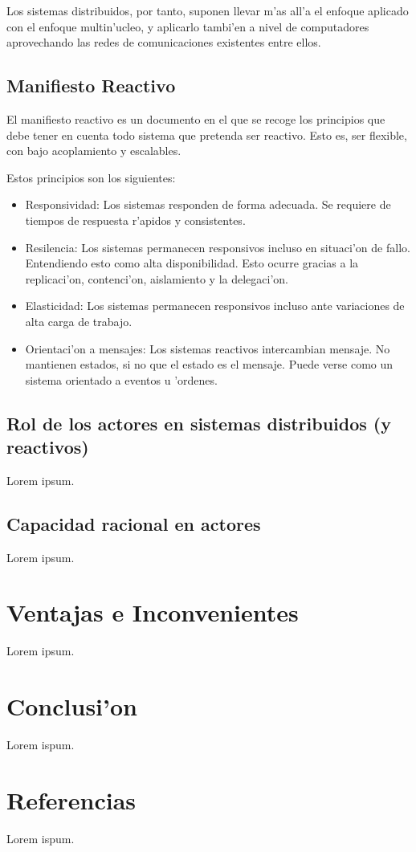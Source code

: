 \documentclass[12pt]{article}
\begin{document}
Los sistemas distribuidos, por tanto, suponen llevar m'as all'a el enfoque aplicado con el enfoque
multin'ucleo, y aplicarlo tambi'en a nivel de computadores aprovechando las redes de comunicaciones
existentes entre ellos.

\subsection{Manifiesto Reactivo}
\label{sub:manifiesto reactivo}
El manifiesto reactivo es un documento en el que se recoge los principios que debe
tener en cuenta todo sistema que pretenda ser reactivo. Esto es, ser flexible, con bajo
acoplamiento y escalables.

Estos principios son los siguientes:

\begin{itemize}
	\item Responsividad: Los sistemas responden de forma adecuada. Se requiere de tiempos
    de respuesta r'apidos y consistentes.
	\item Resilencia: Los sistemas permanecen responsivos incluso en situaci'on de fallo.
    Entendiendo esto como alta disponibilidad. Esto ocurre gracias a la replicaci'on, contenci'on,
    aislamiento y la delegaci'on.
	\item Elasticidad: Los sistemas permanecen responsivos incluso ante variaciones de alta
    carga de trabajo.
	\item Orientaci'on a mensajes: Los sistemas reactivos intercambian mensaje. No mantienen estados,
    si no que el estado es el mensaje. Puede verse como un sistema orientado a eventos u 'ordenes.
\end{itemize}

\subsection{Rol de los actores en sistemas distribuidos (y reactivos)}
\label{sub:rol de los actores en sistemas distribuidos y reactivos}
Lorem ipsum.
\subsection{Capacidad racional en actores}
\label{sub:capacidad racional en actores}
Lorem ipsum.
\section{Ventajas e Inconvenientes}
\label{sec:ventajas e inconvenientes}
Lorem ipsum.
\section{Conclusi'on}
Lorem ispum.
\section{Referencias}
Lorem ispum.
\end{document}
